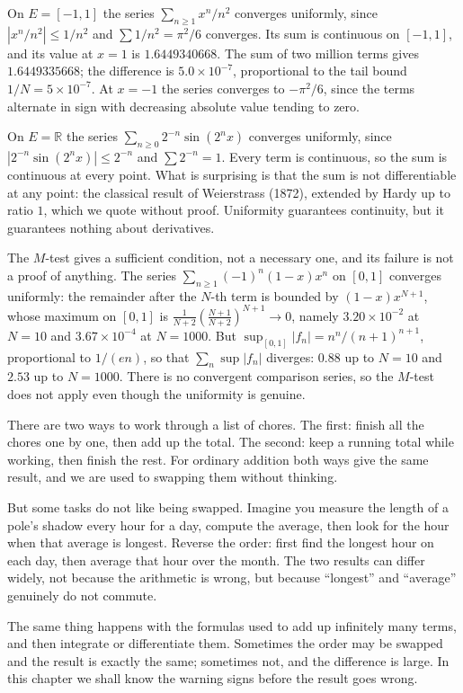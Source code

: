 \begin{contoh}
On $E=[-1,1]$ the series $\sum_{n\ge1}x^n/n^2$ converges uniformly, since
$|x^n/n^2|\le1/n^2$ and $\sum1/n^2=\pi^2/6$ converges. Its sum is continuous on
$[-1,1]$, and its value at $x=1$ is $1.6449340668$. The sum of two million terms
gives $1.6449335668$; the difference is $5.0\times10^{-7}$, proportional to the tail
bound $1/N=5\times10^{-7}$. At $x=-1$ the series converges to $-\pi^2/6$, since
the terms alternate in sign with decreasing absolute value tending to zero.
\end{contoh}

\begin{contoh}
On $E=\mathbb{R}$ the series $\sum_{n\ge0}2^{-n}\sin(2^n x)$ converges uniformly,
since $|2^{-n}\sin(2^n x)|\le2^{-n}$ and $\sum2^{-n}=1$. Every term is continuous,
so the sum is continuous at every point. What is surprising is that the sum is not
differentiable at any point: the classical result of Weierstrass (1872), extended
by Hardy up to ratio $1$, which we quote without proof. Uniformity guarantees
continuity, but it guarantees nothing about derivatives.
\end{contoh}

\begin{catatan}
The $M$-test gives a sufficient condition, not a necessary one, and its failure is not a proof
of anything. The series $\sum_{n\ge1}(-1)^n(1-x)x^n$ on $[0,1]$ converges uniformly:
the remainder after the $N$-th term is bounded by $(1-x)x^{N+1}$, whose maximum on $[0,1]$
is $\tfrac{1}{N+2}\left(\tfrac{N+1}{N+2}\right)^{N+1}\to0$, namely
$3.20\times10^{-2}$ at $N=10$ and $3.67\times10^{-4}$ at $N=1000$. But
$\sup_{[0,1]}|f_n|=n^n/(n+1)^{n+1}$, proportional to $1/(en)$, so that
$\sum_n\sup|f_n|$ diverges: $0.88$ up to $N=10$ and $2.53$ up to $N=1000$.
There is no convergent comparison series, so the $M$-test does not apply even though
the uniformity is genuine.
\end{catatan}

\begin{untukanak}
There are two ways to work through a list of chores. The first: finish all the chores
one by one, then add up the total. The second: keep a running total while
working, then finish the rest. For ordinary addition both ways give the
same result, and we are used to swapping them without thinking.

But some tasks do not like being swapped. Imagine you measure the length of a
pole's shadow every hour for a day, compute the average, then
look for the hour when that average is longest. Reverse the order: first find the
longest hour on each day, then average that hour over the month. The two
results can differ widely, not because the arithmetic is wrong, but because
``longest'' and ``average'' genuinely do not commute.

The same thing happens with the formulas used to add up infinitely
many terms, and then integrate or differentiate them. Sometimes the order may be
swapped and the result is exactly the same; sometimes not, and the difference is large. In this chapter
we shall know the warning signs before the result goes wrong.
\end{untukanak}

